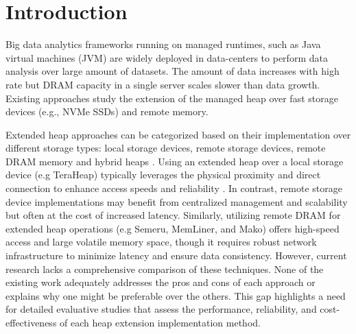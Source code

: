 \section{Introduction}

Big data analytics frameworks running on managed runtimes, such as Java virtual
machines (JVM) are widely deployed in data-centers to perform data analysis over
large amount of datasets. The amount of data increases with high rate but DRAM
capacity in a single server scales slower than data growth. Existing approaches
study the extension of the managed heap over fast storage devices (e.g., NVMe
SSDs) and remote memory.

Extended heap approaches can be categorized based on their implementation over
different storage types: local storage devices, remote storage devices, remote
DRAM memory and hybrid heaps . Using an extended heap over a local storage device
(e.g TeraHeap) typically  leverages the physical proximity and direct connection
to enhance access speeds and reliability . In contrast, remote storage device
implementations may benefit from centralized management and scalability but
often at the cost of increased latency. Similarly, utilizing remote DRAM for
extended heap operations (e.g Semeru, MemLiner, and Mako) offers high-speed
access and large volatile memory space, though it requires robust network
infrastructure  to minimize latency and ensure data
consistency. However, current research lacks a comprehensive comparison of these
techniques. None of the existing work adequately addresses the pros and cons of
each approach or explains why one might be preferable over the others. This gap
highlights a need for detailed evaluative studies that assess the performance,
reliability, and cost-effectiveness of each heap extension implementation
method. 

